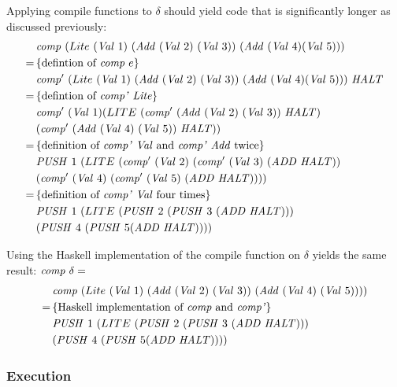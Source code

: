 \documentclass {article}
\begin{document}
Applying compile functions to $\delta$ should
yield code that is significantly longer as
discussed previously:
\begin{align*}	
&\Comp (Lite\ (\Val 1)\ (\Add (\Val 2)\ (\Val 3))\ 
						(\Add (\Val 4) (\Val 5))) \\
=\, & \{ \mbox{defintion of \comp\ $e$} \} \\
&\Compp (Lite\ (\Val 1)\ (\Add (\Val 2)\ (\Val 3))\ 
						(\Add (\Val 4) (\Val 5)))\ \HALT \\
=\, & \{ \mbox{defintion of \compp\ \lite} \} \\
&\Compp  (\Val 1) (LITE\ (\Compp (\Add (\Val 2)\ (\Val 3))\ \HALT)\\ 
							&(\Compp (\Add (\Val 4)\ (\Val 5))\ \HALT)) \\
=\, & \{ \mbox{definition of \compp\ \val\ and \compp\ \add\ twice}\} \\
&\PUSH 1\ (LITE\ (\Compp  (\Val 2)\ (\Compp  (\Val 3)\ (\ADD  \HALT)) \\
				&(\Compp   (\Val 4)\ (\Compp  (\Val 5)\ (\ADD  \HALT)))) \\
=\, & \{ \mbox{definition of \compp\ \val\ four times} \} \\
&\PUSH 1\ (LITE\ (\PUSH 2\ (\PUSH 3\ (\ADD  \HALT))) \\
			&(\PUSH 4\ (\PUSH 5 (\ADD  \HALT))))
\end{align*}

Using the Haskell implementation 
of the compile function on $\delta$
yields the same result: \( \mathit{comp\ } \delta = \)
\begin{align*}
&\Comp (Lite\ (\Val 1)\
		 (\Add (\Val 2)\ (\Val 3))\ 
		(\Add (\Val 4)\ (\Val 5)))) \\
=\, & \{ \mbox{Haskell implementation of \comp\ and \compp} \} \\
&\PUSH 1\ (LITE\ (\PUSH 2\ (\PUSH 3\ (\ADD  \HALT))) \\
		&(\PUSH 4\ (\PUSH 5 (\ADD  \HALT))))
\end{align*}

\subsubsection{Execution}
\end{document}

